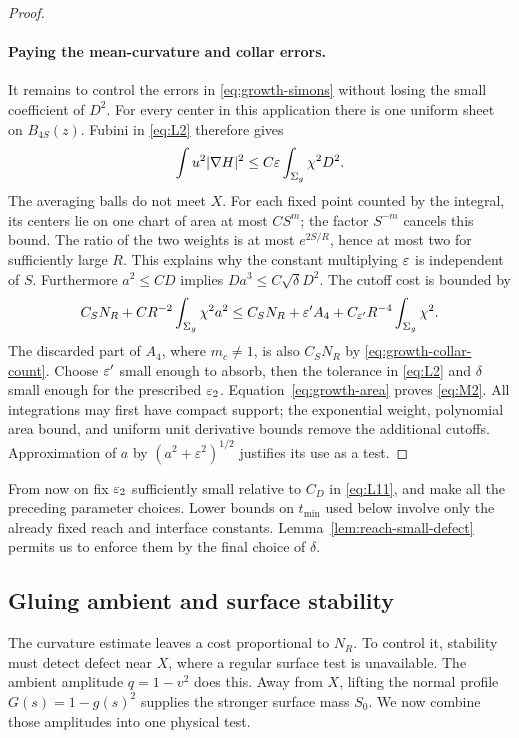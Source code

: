 \begin{proof}
\paragraph{Paying the mean-curvature and collar errors.}
It remains to control the errors in \eqref{eq:growth-simons} without
losing the small coefficient of $D^2$.  For every center in this
application there is one uniform sheet on $B_{4S}(z)$.  Fubini in
\eqref{eq:L2} therefore gives
\[
 \int u^2|\nabla H|^2
 \le C\varepsilon\int_{\Sigma_g}\chi^2D^2.
\]
The averaging balls do not meet $X$.  For each fixed point counted by
the integral, its centers lie on one chart of area at most $CS^m$;
the factor $S^{-m}$ cancels this bound.  The ratio of the two weights is
at most $e^{2S/R}$, hence at most two for sufficiently large $R$.  This
explains why the constant multiplying $\varepsilon$ is independent of $S$.
Furthermore $a^2\le CD$ implies $Da^3\le C\sqrt\delta D^2$.
The cutoff cost is bounded by
\[
 C_S N_R+CR^{-2}\int_{\Sigma_g}\chi^2a^2
 \le C_SN_R+\varepsilon' A_4
      +C_{\varepsilon'}R^{-4}\int_{\Sigma_g}\chi^2.
\]
The discarded part of $A_4$, where $m_c\ne1$, is also $C_SN_R$ by
\eqref{eq:growth-collar-count}.  Choose $\varepsilon'$ small enough to absorb,
then the tolerance in \eqref{eq:L2} and $\delta$ small enough for the
prescribed $\varepsilon_2$.  Equation~\eqref{eq:growth-area} proves
\eqref{eq:M2}.  All integrations may first have compact support; the
exponential weight, polynomial area bound, and uniform unit derivative
bounds remove the additional cutoffs.  Approximation of $a$ by
$(a^2+\varepsilon^2)^{1/2}$ justifies its use as a test.
\end{proof}

From now on fix $\varepsilon_2$ sufficiently small relative to $C_D$ in
\eqref{eq:L11}, and make all the preceding parameter choices.  Lower
bounds on $t_{\min}$ used below involve only the already fixed reach and
interface constants.  Lemma~\ref{lem:reach-small-defect} permits us to
enforce them by the final choice of $\delta$.

\subsection{Gluing ambient and surface stability}

The curvature estimate leaves a cost proportional to $N_R$.  To
control it, stability must detect defect near $X$, where a regular
surface test is unavailable.  The ambient amplitude $q=1-v^2$ does
this.  Away from $X$, lifting the normal profile
$G(s)=1-g(s)^2$ supplies the stronger surface mass $S_0$.
We now combine those amplitudes into one physical test.

